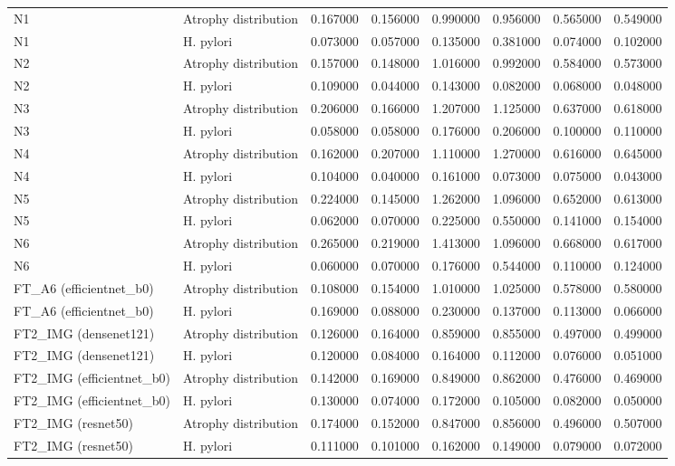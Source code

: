 \begin{table}
\begin{tabular}{llrrrrrr}
N1 & Atrophy distribution & 0.167000 & 0.156000 & 0.990000 & 0.956000 & 0.565000 & 0.549000 \\
N1 & H. pylori & 0.073000 & 0.057000 & 0.135000 & 0.381000 & 0.074000 & 0.102000 \\
N2 & Atrophy distribution & 0.157000 & 0.148000 & 1.016000 & 0.992000 & 0.584000 & 0.573000 \\
N2 & H. pylori & 0.109000 & 0.044000 & 0.143000 & 0.082000 & 0.068000 & 0.048000 \\
N3 & Atrophy distribution & 0.206000 & 0.166000 & 1.207000 & 1.125000 & 0.637000 & 0.618000 \\
N3 & H. pylori & 0.058000 & 0.058000 & 0.176000 & 0.206000 & 0.100000 & 0.110000 \\
N4 & Atrophy distribution & 0.162000 & 0.207000 & 1.110000 & 1.270000 & 0.616000 & 0.645000 \\
N4 & H. pylori & 0.104000 & 0.040000 & 0.161000 & 0.073000 & 0.075000 & 0.043000 \\
N5 & Atrophy distribution & 0.224000 & 0.145000 & 1.262000 & 1.096000 & 0.652000 & 0.613000 \\
N5 & H. pylori & 0.062000 & 0.070000 & 0.225000 & 0.550000 & 0.141000 & 0.154000 \\
N6 & Atrophy distribution & 0.265000 & 0.219000 & 1.413000 & 1.096000 & 0.668000 & 0.617000 \\
N6 & H. pylori & 0.060000 & 0.070000 & 0.176000 & 0.544000 & 0.110000 & 0.124000 \\
FT\_A6 (efficientnet\_b0) & Atrophy distribution & 0.108000 & 0.154000 & 1.010000 & 1.025000 & 0.578000 & 0.580000 \\
FT\_A6 (efficientnet\_b0) & H. pylori & 0.169000 & 0.088000 & 0.230000 & 0.137000 & 0.113000 & 0.066000 \\
FT2\_IMG (densenet121) & Atrophy distribution & 0.126000 & 0.164000 & 0.859000 & 0.855000 & 0.497000 & 0.499000 \\
FT2\_IMG (densenet121) & H. pylori & 0.120000 & 0.084000 & 0.164000 & 0.112000 & 0.076000 & 0.051000 \\
FT2\_IMG (efficientnet\_b0) & Atrophy distribution & 0.142000 & 0.169000 & 0.849000 & 0.862000 & 0.476000 & 0.469000 \\
FT2\_IMG (efficientnet\_b0) & H. pylori & 0.130000 & 0.074000 & 0.172000 & 0.105000 & 0.082000 & 0.050000 \\
FT2\_IMG (resnet50) & Atrophy distribution & 0.174000 & 0.152000 & 0.847000 & 0.856000 & 0.496000 & 0.507000 \\
FT2\_IMG (resnet50) & H. pylori & 0.111000 & 0.101000 & 0.162000 & 0.149000 & 0.079000 & 0.072000 \\
\bottomrule
\end{tabular}
\end{table}
